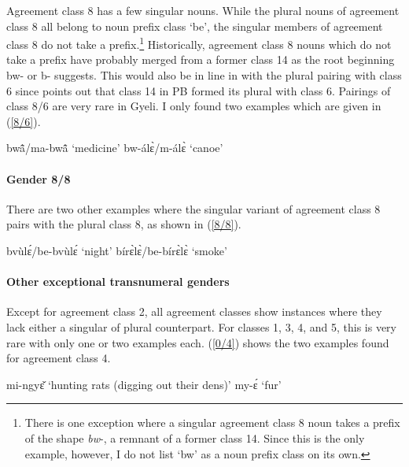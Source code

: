 Agreement class 8 has a few singular nouns. While the plural nouns of agreement class 8 all belong to noun prefix class `be', the singular members of agreement class 8 do not take a prefix.\footnote{There is one exception where a singular agreement class 8 noun takes a prefix of the shape {\itshape bw}-, a remnant of a former class 14. Since this is the only example, however, I do not list `bw' as a noun prefix class on its own.}
 Historically, agreement class 8 nouns which do not take a prefix have probably merged from a former class 14 as the root  beginning bw- or b- suggests. This would also be in line in with the plural pairing with class 6 since \citet[100]{meeussen67} points out that class 14 in PB formed its plural with class 6. Pairings of class 8/6 are very rare in Gyeli. I only found two examples which are given in (\ref{8/6}).

\begin{exe}
\ex\label{8/6}
\begin{xlist}
\ex bwã̂/ma-bwã̂ `medicine'
\ex bw-álɛ̀/m-álɛ̀ `canoe'
\end{xlist}
\end{exe}



\paragraph{Gender 8/8}
There are two other examples where the singular variant of agreement class 8 pairs with the plural class 8, as shown in (\ref{8/8}). 

\begin{exe}
\ex\label{8/8}
\begin{xlist}
\ex bvùlɛ́/be-bvùlɛ́ `night'
\ex bírɛ̀lɛ̀/be-bírɛ̀lɛ̀ `smoke'
\end{xlist}
\end{exe}

\paragraph{Other exceptional transnumeral genders}

Except for agreement class 2, all agreement classes show instances where they lack either a singular of plural counterpart. For classes 1, 3, 4, and 5, this is very rare with only one or two examples each. (\ref{0/4}) shows the two examples found for agreement class 4.


\begin{exe}
\ex\label{0/4}
\begin{xlist}
\ex mi-ngyɛ̌ `hunting rats (digging out their dens)'
\ex my-ɛ́ `fur'
\end{xlist}
\end{exe}

